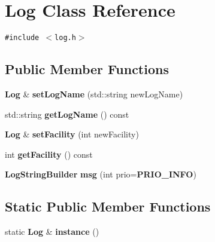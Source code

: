 \section{Log Class Reference}
\label{classLog}
{\tt \#include $<$log.h$>$}

\subsection*{Public Member Functions}
\begin{CompactItemize}
\item 
{\bf Log} \& {\bf set\-Log\-Name} (std::string new\-Log\-Name)
\item 
std::string {\bf get\-Log\-Name} () const
\item 
{\bf Log} \& {\bf set\-Facility} (int new\-Facility)
\item 
int {\bf get\-Facility} () const
\item 
{\bf Log\-String\-Builder} {\bf msg} (int prio={\bf PRIO\_\-INFO})
\end{CompactItemize}
\subsection*{Static Public Member Functions}
\begin{CompactItemize}
\item 
static {\bf Log} \& {\bf instance} ()
\end{CompactItemize}
